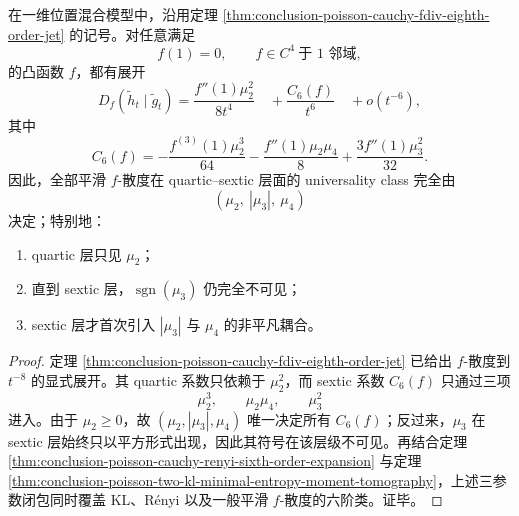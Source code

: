 \begin{theorem}\label{thm:conclusion-poisson-cauchy-sextic-threeparameter-closure}
在一维位置混合模型中，沿用定理 \ref{thm:conclusion-poisson-cauchy-fdiv-eighth-order-jet} 的记号。对任意满足
\[
f(1)=0,
\qquad
f\in C^4\ \text{于 }1\text{ 邻域},
\]
的凸函数 \(f\)，都有展开
\[
D_f(\tilde h_t\mid \tilde g_t)
=
\frac{f''(1)\mu_2^2}{8t^4}
\quad+\frac{C_6(f)}{t^6}
\quad+o(t^{-6}),
\]
其中
\[
C_6(f)
=
-\frac{f^{(3)}(1)\mu_2^3}{64}
-\frac{f''(1)\mu_2\mu_4}{8}
+\frac{3f''(1)\mu_3^2}{32}.
\]
因此，全部平滑 \(f\)-散度在 quartic--sextic 层面的 universality class 完全由
\[
(\mu_2,\ |\mu_3|,\ \mu_4)
\]
决定；特别地：
\begin{enumerate}
  \item quartic 层只见 \(\mu_2\)；
  \item 直到 sextic 层，\(\operatorname{sgn}(\mu_3)\) 仍完全不可见；
  \item sextic 层才首次引入 \(|\mu_3|\) 与 \(\mu_4\) 的非平凡耦合。
\end{enumerate}
\end{theorem}
\begin{proof}
定理 \ref{thm:conclusion-poisson-cauchy-fdiv-eighth-order-jet} 已给出 \(f\)-散度到 \(t^{-8}\) 的显式展开。其 quartic 系数只依赖于 \(\mu_2^2\)，而 sextic 系数 \(C_6(f)\) 只通过三项
\[
\mu_2^3,\qquad \mu_2\mu_4,\qquad \mu_3^2
\]
进入。由于 \(\mu_2\ge 0\)，故 \((\mu_2,|\mu_3|,\mu_4)\) 唯一决定所有 \(C_6(f)\)；反过来，\(\mu_3\) 在 sextic 层始终只以平方形式出现，因此其符号在该层级不可见。再结合定理 \ref{thm:conclusion-poisson-cauchy-renyi-sixth-order-expansion} 与定理 \ref{thm:conclusion-poisson-two-kl-minimal-entropy-moment-tomography}，上述三参数闭包同时覆盖 KL、R\'enyi 以及一般平滑 \(f\)-散度的六阶类。证毕。
\end{proof}

